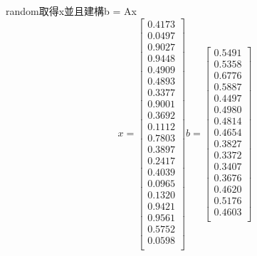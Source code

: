 \documentclass[12pt]{article}
\begin{document}
        random取得x並且建構b = Ax\\
        \[
            x=
            \left[
            \begin{array}{c}
                0.4173\\
                0.0497\\
                0.9027\\
                0.9448\\
                0.4909\\
                0.4893\\
                0.3377\\
                0.9001\\
                0.3692\\
                0.1112\\
                0.7803\\
                0.3897\\
                0.2417\\
                0.4039\\
                0.0965\\
                0.1320\\
                0.9421\\
                0.9561\\
                0.5752\\
                0.0598\\
            \end{array}
            \right]
            b=
            \left[
                \begin{array}{c}
                    0.5491\\
                    0.5358\\
                    0.6776\\
                    0.5887\\
                    0.4497\\
                    0.4980\\
                    0.4814\\
                    0.4654\\
                    0.3827\\
                    0.3372\\
                    0.3407\\
                    0.3676\\
                    0.4620\\
                    0.5176\\
                    0.4603\\
                \end{array}
            \right]
        \]
\end{document}
